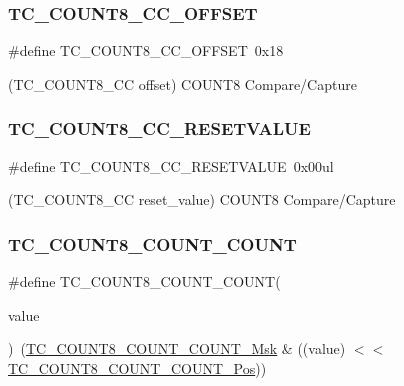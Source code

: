 \subsubsection{\texorpdfstring{TC\_COUNT8\_CC\_OFFSET}{TC\_COUNT8\_CC\_OFFSET}}
{\footnotesize\ttfamily \#define T\+C\+\_\+\+C\+O\+U\+N\+T8\+\_\+\+C\+C\+\_\+\+O\+F\+F\+S\+ET~0x18}



(T\+C\+\_\+\+C\+O\+U\+N\+T8\+\_\+\+CC offset) C\+O\+U\+N\+T8 Compare/\+Capture 

\mbox{\label{group___s_a_m_d21___t_c_ga09abf72b575bcaba5ae5f6fa4b468d85}} 
\subsubsection{\texorpdfstring{TC\_COUNT8\_CC\_RESETVALUE}{TC\_COUNT8\_CC\_RESETVALUE}}
{\footnotesize\ttfamily \#define T\+C\+\_\+\+C\+O\+U\+N\+T8\+\_\+\+C\+C\+\_\+\+R\+E\+S\+E\+T\+V\+A\+L\+UE~0x00ul}



(T\+C\+\_\+\+C\+O\+U\+N\+T8\+\_\+\+CC reset\+\_\+value) C\+O\+U\+N\+T8 Compare/\+Capture 

\mbox{\label{group___s_a_m_d21___t_c_ga2454469d684f3ae8baeb626c5b86e4dd}} 
\subsubsection{\texorpdfstring{TC\_COUNT8\_COUNT\_COUNT}{TC\_COUNT8\_COUNT\_COUNT}}
{\footnotesize\ttfamily \#define T\+C\+\_\+\+C\+O\+U\+N\+T8\+\_\+\+C\+O\+U\+N\+T\+\_\+\+C\+O\+U\+NT(\begin{DoxyParamCaption}\item[{}]{value }\end{DoxyParamCaption})~(\mbox{\hyperlink{group___s_a_m_d21___t_c_ga11ba271da41b4c44d733730d6af7e043}{T\+C\+\_\+\+C\+O\+U\+N\+T8\+\_\+\+C\+O\+U\+N\+T\+\_\+\+C\+O\+U\+N\+T\+\_\+\+Msk}} \& ((value) $<$$<$ \mbox{\hyperlink{group___s_a_m_d21___t_c_gaafae4aec475e0bb262331b9a90944755}{T\+C\+\_\+\+C\+O\+U\+N\+T8\+\_\+\+C\+O\+U\+N\+T\+\_\+\+C\+O\+U\+N\+T\+\_\+\+Pos}}))}

